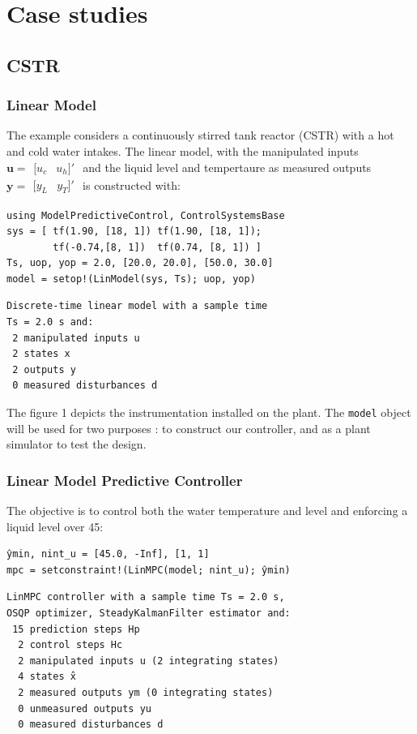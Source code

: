 \section{Case studies}

\subsection{CSTR}

\subsubsection{Linear Model}

The example considers a continuously stirred tank reactor (CSTR) with a hot and cold water intakes. The linear model, with the manipulated inputs $\mathbf{u}=\begin{smallmatrix}[
u_c & u_h]'\end{smallmatrix}$ and the liquid level and tempertaure as measured outputs $\mathbf{y}=\begin{smallmatrix}[y_L & y_T]'\end{smallmatrix}$ is constructed with:

\begin{verbatim}
using ModelPredictiveControl, ControlSystemsBase
sys = [ tf(1.90, [18, 1]) tf(1.90, [18, 1]);
        tf(-0.74,[8, 1])  tf(0.74, [8, 1]) ]
Ts, uop, yop = 2.0, [20.0, 20.0], [50.0, 30.0]
model = setop!(LinModel(sys, Ts); uop, yop)
\end{verbatim}
\vspace{-26pt}
\begin{verbatim}
Discrete-time linear model with a sample time 
Ts = 2.0 s and:
 2 manipulated inputs u
 2 states x
 2 outputs y
 0 measured disturbances d
\end{verbatim}

The figure 1 depicts the instrumentation installed on the plant. The \texttt{model} object will be used for two purposes : to construct our controller, and as a plant simulator to test the design.

\subsubsection{Linear Model Predictive Controller}

The objective is to control both the water temperature and level and enforcing a liquid level over 45:

\begin{verbatim}
ŷmin, nint_u = [45.0, -Inf], [1, 1]
mpc = setconstraint!(LinMPC(model; nint_u); ŷmin)
\end{verbatim}
\vspace{-25pt}
\begin{verbatim}
LinMPC controller with a sample time Ts = 2.0 s,
OSQP optimizer, SteadyKalmanFilter estimator and:
 15 prediction steps Hp
  2 control steps Hc
  2 manipulated inputs u (2 integrating states)
  4 states x̂
  2 measured outputs ym (0 integrating states)
  0 unmeasured outputs yu
  0 measured disturbances d
\end{verbatim}

